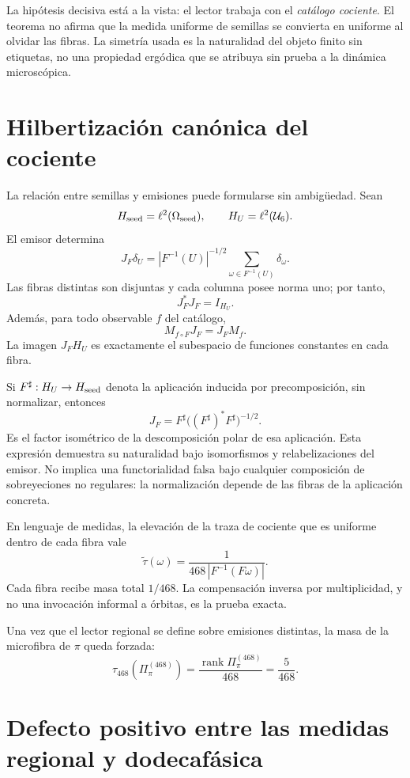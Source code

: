 La hipótesis decisiva está a la vista: el lector trabaja con el
\emph{catálogo cociente}. El teorema no afirma que la medida uniforme de
semillas se convierta en uniforme al olvidar las fibras. La simetría usada
es la naturalidad del objeto finito sin etiquetas, no una propiedad
ergódica que se atribuya sin prueba a la dinámica microscópica.

\section{Hilbertización canónica del cociente}

La relación entre semillas y emisiones puede formularse sin ambigüedad.
Sean
\[
 H_{\rm seed}=\ell^2(\Omega_{\rm seed}),
 \qquad
 H_U=\ell^2(\mathcal U_6).
\]
El emisor determina
\[
 \boxed{
 J_F\delta_U
 =|F^{-1}(U)|^{-1/2}
 \sum_{\omega\in F^{-1}(U)}\delta_\omega.
 }
\]
Las fibras distintas son disjuntas y cada columna posee norma uno; por
tanto,
\[
 J_F^*J_F=I_{H_U}.
\]
Además, para todo observable \(f\) del catálogo,
\[
 M_{f\circ F}J_F=J_FM_f.
\]
La imagen \(J_FH_U\) es exactamente el subespacio de funciones constantes
en cada fibra.

Si \(F^\sharp:H_U\to H_{\rm seed}\) denota la aplicación inducida por
precomposición, sin normalizar,
entonces
\[
 J_F
 =F^\sharp\bigl((F^\sharp)^*F^\sharp\bigr)^{-1/2}.
\]
Es el factor isométrico de la descomposición polar de esa aplicación. Esta
expresión demuestra su naturalidad bajo isomorfismos y relabelizaciones del
emisor. No implica una functorialidad falsa bajo cualquier composición de
sobreyeciones no regulares: la normalización depende de las fibras de la
aplicación concreta.

En lenguaje de medidas, la elevación de la traza de cociente que es
uniforme dentro de cada fibra vale
\[
 \widetilde\tau(\omega)
 =\frac1{468\,|F^{-1}(F\omega)|}.
\]
Cada fibra recibe masa total \(1/468\). La compensación inversa por
multiplicidad, y no una invocación informal a órbitas, es la prueba exacta.

\begin{corollary}[Canonicidad de \(5/468\)]
\label{p3-20260826:cor:canonicidad-cinco-468}
Una vez que el lector regional se define sobre emisiones distintas, la masa
de la microfibra de \(\pi\) queda forzada:
\[
 \tau_{468}(\Pi_\pi^{(468)})
 =\frac{\operatorname{rank}\Pi_\pi^{(468)}}{468}
 =\frac5{468}.
\]
\end{corollary}

\section{Defecto positivo entre las medidas regional y dodecafásica}

